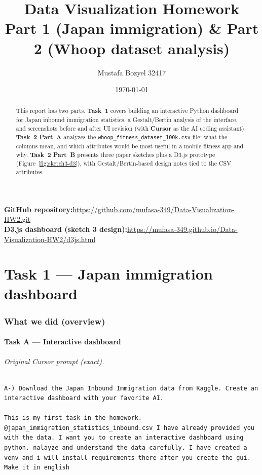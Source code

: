\documentclass[11pt,a4paper]{article}
\title{Data Visualization Homework\\Part 1 (Japan immigration) \& Part 2 (Whoop dataset analysis)}
\author{Mustafa Bozyel 32417}
\date{\today}
\begin{document}
\maketitle

\begin{center}
\small
\textbf{GitHub repository:}\quad \url{https://github.com/mufasa-349/Data-Visualization-HW2.git}\\[0.4em]
\textbf{D3.js dashboard (sketch 3 design):}\quad \url{https://mufasa-349.github.io/Data-Visualization-HW2/d3js.html}
\end{center}
\vspace{0.75em}

\begin{abstract}
This report has two parts. \textbf{Task~1} covers building an interactive Python dashboard for Japan inbound immigration statistics, a Gestalt/Bertin analysis of the interface, and screenshots before and after UI revision (with \textbf{Cursor} as the AI coding assistant). \textbf{Task~2 Part~A} analyzes the \texttt{whoop\_fitness\_dataset\_100k.csv} file: what the columns mean, and which attributes would be most useful in a mobile fitness app and why. \textbf{Task~2 Part~B} presents three paper sketches plus a D3.js prototype (Figure~\ref{fig:sketch3-d3}), with Gestalt/Bertin-based design notes tied to the CSV attributes.
\end{abstract}

\part{Task 1 --- Japan immigration dashboard}

\section{What we did (overview)}

\subsection{Task A --- Interactive dashboard}

\paragraph{Original Cursor prompt (exact).}
\begin{lstlisting}
A-) Download the Japan Inbound Immigration data from Kaggle. Create an interactive dashboard with your favorite AI. 

This is my first task in the homework. @japan_immigration_statistics_inbound.csv I have already provided you with the data. I want you to create an interactive dashboard using python. nalayze and understand the data carefully. I have created a venv and i will install requirements there after you create the gui. Make it in english
\end{lstlisting}
\end{document}
